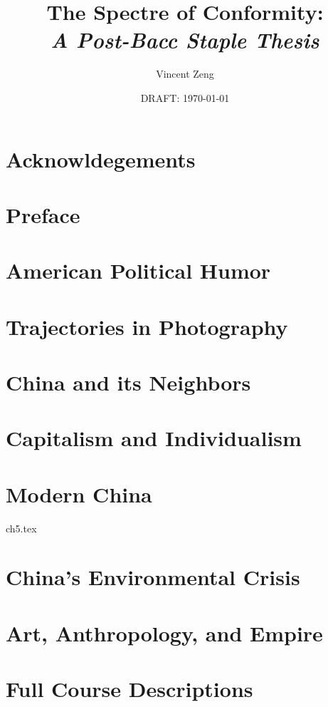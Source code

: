 \documentclass{book}[10pt]
\title{\Huge{The Spectre of Conformity:\\
\textit{A Post-Bacc Staple Thesis}}}
\author{Vincent Zeng}
\date{DRAFT: \today}
\begin{document}
\maketitle



\frontmatter
\chapter*{Acknowldegements}
\thispagestyle{empty}

\tableofcontents

\chapter{Preface}



\mainmatter

\chapter{American Political Humor}


\chapter{Trajectories in Photography}


\chapter{China and its Neighbors}


\chapter{Capitalism and Individualism}


\chapter{Modern China}
 {ch5.tex}

\chapter{China's Environmental Crisis}


\chapter{Art, Anthropology, and Empire}


\appendix

\chapter{Full Course Descriptions}


\end{document}

